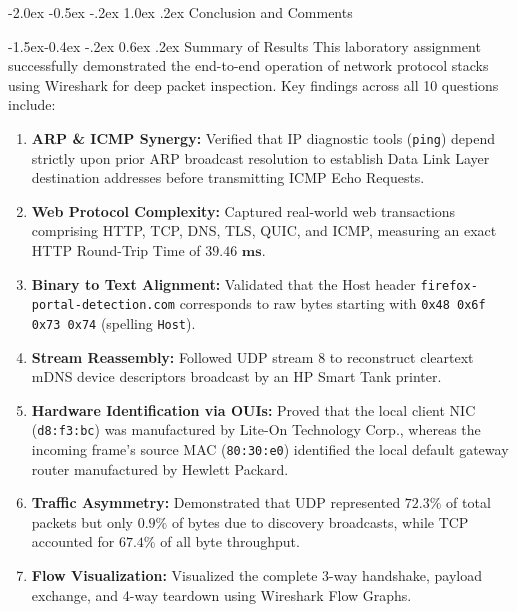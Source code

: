 \documentclass[11pt,a4paper]{article}
\makeatletter
\renewcommand\section{\@startsection {section}{1}{\z@}%
  {-2.0ex \@plus -0.5ex \@minus -.2ex}%
  {1.0ex \@plus .2ex}%
  {\normalfont\Large\bfseries}}
\renewcommand\subsection{\@startsection{subsection}{2}{\z@}%
  {-1.5ex\@plus -0.4ex \@minus -.2ex}%
  {0.6ex \@plus .2ex}%
  {\normalfont\large\bfseries}}
\makeatother
\begin{document}
\section{Conclusion and Comments}

\subsection{Summary of Results}
This laboratory assignment successfully demonstrated the end-to-end operation of network protocol stacks using Wireshark for deep packet inspection. Key findings across all 10 questions include:
\begin{enumerate}
  \item \textbf{ARP \& ICMP Synergy:} Verified that IP diagnostic tools (\texttt{ping}) depend strictly upon prior ARP broadcast resolution to establish Data Link Layer destination addresses before transmitting ICMP Echo Requests.
  \item \textbf{Web Protocol Complexity:} Captured real-world web transactions comprising HTTP, TCP, DNS, TLS, QUIC, and ICMP, measuring an exact HTTP Round-Trip Time of $\mathbf{39.46\text{ ms}}$.
  \item \textbf{Binary to Text Alignment:} Validated that the Host header \texttt{firefox-portal-detection.com} corresponds to raw bytes starting with \texttt{0x48 0x6f 0x73 0x74} (spelling \texttt{Host}).
  \item \textbf{Stream Reassembly:} Followed UDP stream 8 to reconstruct cleartext mDNS device descriptors broadcast by an HP Smart Tank printer.
  \item \textbf{Hardware Identification via OUIs:} Proved that the local client NIC (\texttt{d8:f3:bc}) was manufactured by Lite-On Technology Corp., whereas the incoming frame's source MAC (\texttt{80:30:e0}) identified the local default gateway router manufactured by Hewlett Packard.
  \item \textbf{Traffic Asymmetry:} Demonstrated that UDP represented $\mathbf{72.3\%}$ of total packets but only $\mathbf{0.9\%}$ of bytes due to discovery broadcasts, while TCP accounted for $\mathbf{67.4\%}$ of all byte throughput.
  \item \textbf{Flow Visualization:} Visualized the complete 3-way handshake, payload exchange, and 4-way teardown using Wireshark Flow Graphs.
\end{enumerate}
\end{document}
